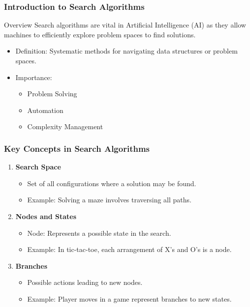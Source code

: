 \documentclass[aspectratio=169]{beamer}
\begin{document}
\frame{\titlepage}

\begin{frame}[fragile]
    \frametitle{Introduction to Search Algorithms}
    \begin{block}{Overview}
        Search algorithms are vital in Artificial Intelligence (AI) as they allow machines to efficiently explore problem spaces to find solutions. 
    \end{block}
    \begin{itemize}
        \item Definition: Systematic methods for navigating data structures or problem spaces.
        \item Importance:
        \begin{itemize}
            \item Problem Solving
            \item Automation
            \item Complexity Management
        \end{itemize}
    \end{itemize}
\end{frame}

\begin{frame}[fragile]
    \frametitle{Key Concepts in Search Algorithms}
    \begin{enumerate}
        \item \textbf{Search Space}
        \begin{itemize}
            \item Set of all configurations where a solution may be found.
            \item Example: Solving a maze involves traversing all paths.
        \end{itemize}

        \item \textbf{Nodes and States}
        \begin{itemize}
            \item Node: Represents a possible state in the search.
            \item Example: In tic-tac-toe, each arrangement of X's and O's is a node.
        \end{itemize}

        \item \textbf{Branches}
        \begin{itemize}
            \item Possible actions leading to new nodes.
            \item Example: Player moves in a game represent branches to new states.
        \end{itemize}
    \end{enumerate}
\end{frame}
\end{document}
